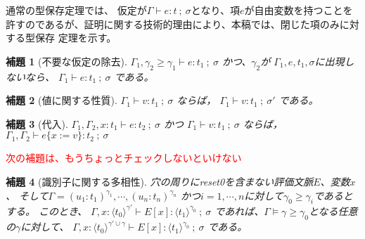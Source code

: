 \documentclass[T]{compsoft}
\newcommand\red[1]{\textcolor{red}{#1}}
\newcommand\Resetz{\textbf{reset0}}
\newcommand\codeT[2]{\langle{#1}\rangle^{#2}}
\newcommand\ord{\ge}
\newcommand\lto{\leadsto}
\newcommand\kam[1]{\red{{#1}}}
\theoremstyle{break}
\newtheorem{theo}{定理}[section]
\newtheorem{lemm}{補題}[section]
\begin{document}
通常の型保存定理では、
仮定が$\Gamma \vdash e:t~;~\sigma$となり、項$e$が自由変数を持つことを
許すのであるが、証明に関する技術的理由により、本稿では、閉じた項のみに対する型保存
定理を示す。

\begin{lemm}[不要な仮定の除去]
  $\Gamma_1,\gamma_2 \ord \gamma_1 \vdash e : t_1 ~;~\sigma$
  かつ、$\gamma_2$が $\Gamma_1, e, t_1, \sigma$に出現しないなら、
  $\Gamma_1 \vdash e : t_1 ~;~\sigma$ である。
\end{lemm}

\begin{lemm}[値に関する性質]
  $\Gamma_1 \vdash v : t_1 ~;~\sigma$
  ならば，
  $\Gamma_1 \vdash v : t_1 ~;~\sigma'$
  である。
\end{lemm}

\begin{lemm}[代入]
  $\Gamma_1, \Gamma_2, x : t_1 \vdash e : t_2 ~;~\sigma$
  かつ
  $\Gamma_1 \vdash v : t_1 ~;~\sigma$
  ならば，
  $\Gamma_1, \Gamma_2 \vdash e\{x := v\} : t_2~;~\sigma$
\end{lemm}


\kam{次の補題は、もうちょっとチェックしないといけない}

\begin{lemm}[識別子に関する多相性]
  穴の周りにreset0を含まない評価文脈$E$、変数$x$、
  そして$\Gamma = (u_1:t_1)^{\gamma_1}, \cdots, (u_n:t_n)^{\gamma_n}$
  かつ$i=1,\cdots,n$に対して$\gamma_0 \ord \gamma_i$であるとする。
  このとき、
  $\Gamma, x:\codeT{t_0}{\gamma'} \vdash E[x] : \codeT{t_1}{\gamma_0} ~;~\sigma$
  であれば、$\Gamma \models \gamma \ord \gamma_0$となる任意の$\gamma$に対して、
  $\Gamma, x:\codeT{t_0}{\gamma'\cup \gamma} \vdash
  E[x] : \codeT{t_1}{\gamma_0} ~;~\sigma$
  である。
\end{lemm}

%
\end{document}
